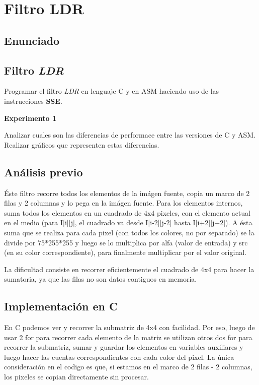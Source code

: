 \section{Filtro LDR}
\subsection{Enunciado}

\subsection*{Filtro \textit{LDR}}
  Programar el filtro \textit{LDR} en lenguaje C y en
  ASM haciendo uso de las instrucciones \textbf{SSE}.

\vspace*{0.3cm} \noindent
\textbf{Experimento 1}

  Analizar cuales son las diferencias de performace entre las versiones de C y ASM. 
  Realizar gráficos que representen estas diferencias.
  
\subsection{An\'alisis previo}
\'Este filtro recorre todos los elementos de la im\'agen fuente, copia un marco de 2 filas y 2 columnas y lo pega en la im\'agen fuente. Para los elementos internos, 
suma todos los elementos en un cuadrado de 4x4 pixeles, con el elemento actual en el medio (para I[i][j], el cuadrado va desde I[i-2][j-2] hasta I[i+2][j+2]).
A \'esta suma que se realiza para cada pixel (con todos los colores, no por separado) se la divide por 75*255*255 y luego se lo multiplica por alfa (valor de entrada) 
y src (en su color correspondiente), para finalmente multiplicar por el valor original.

La dificultad consiste en recorrer eficientemente el cuadrado de 4x4 para hacer la sumatoria, ya que las filas no son datos contiguos en memoria.

\subsection{Implementaci\'on en C}
En C podemos ver y recorrer la submatriz de 4x4 con facilidad. Por eso, luego de usar 2 for para recorrer cada elemento de la matriz se utilizan otros dos for para 
recorrer la submatriz, sumar y guardar los elementos en variables auxiliares y luego hacer las cuentas correspondientes con cada color del pixel.
La \'unica consideraci\'on en el codigo es que, si estamos en el marco de 2 filas - 2 columnas, los pixeles se copian directamente sin procesar.


